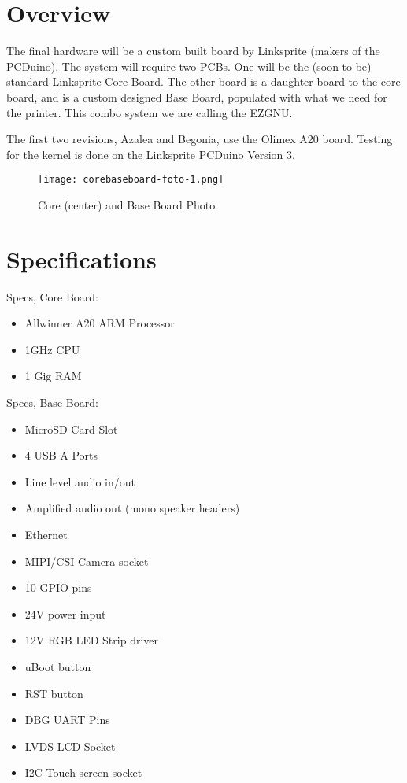 %
%
%
%
%

\section{Overview}
The final hardware will be a custom built board by Linksprite (makers of the
PCDuino). The system will require two PCBs. One will be the (soon-to-be)
standard Linksprite Core Board. The other board is a daughter board to the
core board, and is a custom designed Base Board, populated with what we need
for the printer. This combo system we are calling the EZGNU.

The first two revisions, Azalea and Begonia, use the Olimex A20 board. Testing
for the kernel is done on the Linksprite PCDuino Version 3.

\begin{figure}[H]
\centering
\texttt{[image: corebaseboard-foto-1.png]}
\caption{Core (center) and Base Board Photo}
\label{fig:bbfoto}
\end{figure}


\section{Specifications}
Specs, Core Board:

\begin{itemize}
  \item{Allwinner A20 ARM Processor}
  \item{1GHz CPU}
  \item{1 Gig RAM}
\end{itemize}

Specs, Base Board:
\begin{itemize}
  \item{MicroSD Card Slot}
  \item{4 USB A Ports}
  \item{Line level audio in/out}
  \item{Amplified audio out (mono speaker headers)}
  \item{Ethernet}
  \item{MIPI/CSI Camera socket}
  \item{10 GPIO pins}
  \item{24V power input}
  \item{12V RGB LED Strip driver}
  \item{uBoot button}
  \item{RST button}
  \item{DBG UART Pins}
  \item{LVDS LCD Socket}
  \item{I2C Touch screen socket}
\end{itemize}

